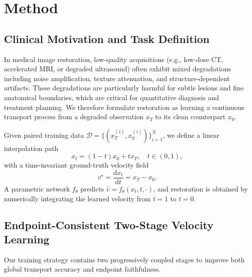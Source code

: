 \section{Method}
\label{sec:method}

\subsection{Clinical Motivation and Task Definition}
In medical image restoration, low-quality acquisitions (e.g., low-dose CT, accelerated MRI, or degraded ultrasound) often exhibit mixed degradations including noise amplification, texture attenuation, and structure-dependent artifacts. These degradations are particularly harmful for subtle lesions and fine anatomical boundaries, which are critical for quantitative diagnosis and treatment planning. We therefore formulate restoration as learning a continuous transport process from a degraded observation $x_T$ to its clean counterpart $x_0$.

Given paired training data $\mathcal{D}=\{(x_T^{(i)},x_0^{(i)})\}_{i=1}^{N}$, we define a linear interpolation path
\begin{equation}
 x_t=(1-t)x_0+tx_T,\quad t\in(0,1),
 \label{eq:path}
\end{equation}
with a time-invariant ground-truth velocity field
\begin{equation}
 v^{\star}=\frac{\mathrm{d}x_t}{\mathrm{d}t}=x_T-x_0.
 \label{eq:gt_velocity}
\end{equation}
A parametric network $f_{\theta}$ predicts $\hat v=f_{\theta}(x_t,t,\cdot)$, and restoration is obtained by numerically integrating the learned velocity from $t=1$ to $t=0$.

\subsection{Endpoint-Consistent Two-Stage Velocity Learning}
\label{subsec:two_stage}
Our training strategy contains two progressively coupled stages to improve both global transport accuracy and endpoint faithfulness.

